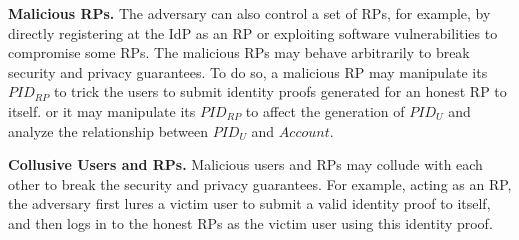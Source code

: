
\noindent \textbf{Malicious RPs.}
The adversary can also control a set of RPs, for example, by directly registering at the IdP as an RP or exploiting software vulnerabilities to compromise some RPs.
The malicious RPs may behave arbitrarily to break security and privacy guarantees.
To do so, %
a malicious RP may manipulate its $PID_{RP}$ to trick the users to submit identity proofs generated for an honest RP to itself. %
or it may manipulate its $PID_{RP}$ to affect the generation of $PID_U$ and analyze the relationship between $PID_U$ and $Account$.

\noindent \textbf{Collusive Users and RPs.} %
Malicious users and RPs may collude with each other %
to break the security and privacy guarantees.
For example, acting as an RP, the adversary first lures a victim user to submit a valid identity proof to itself, and then logs in to the honest RPs as the victim  user using this identity proof.




